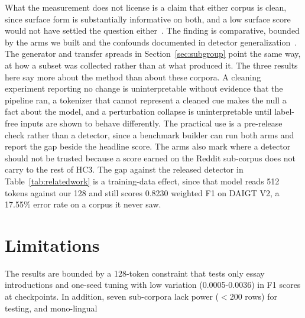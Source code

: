 \documentclass[conference,a4paper]{IEEEtran}
\newcommand{\secref}[1]{\hyperref[#1]{\ref*{#1}}}
\newcommand{\tabref}[1]{\hyperref[#1]{\ref*{#1}}}
\begin{document}
What the measurement does not license is a claim that either corpus is clean, since surface form is substantially informative on both, and a low surface score would not have settled the question either~\cite{Feng2019misleading}. The finding is comparative, bounded by the arms we built and the confounds documented in detector generalization~\cite{Borile2025generalize}. The generator and transfer spreads in Section~\secref{sec:subgroup} point the same way, at how a subset was collected rather than at what produced it. The three results here say more about the method than about these corpora. A cleaning experiment reporting no change is uninterpretable without evidence that the pipeline ran, a tokenizer that cannot represent a cleaned cue makes the null a fact about the model, and a perturbation collapse is uninterpretable until label-free inputs are shown to behave differently. The practical use is a pre-release check rather than a detector, since a benchmark builder can run both arms and report the gap beside the headline score. The arms also mark where a detector should not be trusted because a score earned on the Reddit sub-corpus does not carry to the rest of HC3. The gap against the released detector in Table~\tabref{tab:relatedwork} is a training-data effect, since that model reads 512 tokens against our 128 and still scores 0.8230 weighted F1 on DAIGT V2, a 17.55\% error rate on a corpus it never saw.

\section{Limitations}
\label{sec:limitations}


The results are bounded by a 128-token constraint that tests only essay introductions and one-seed tuning with low variation (0.0005-0.0036) in F1 scores at checkpoints. In addition, seven sub-corpora lack power ($<$200 rows) for testing, and mono-lingual
\end{document}
